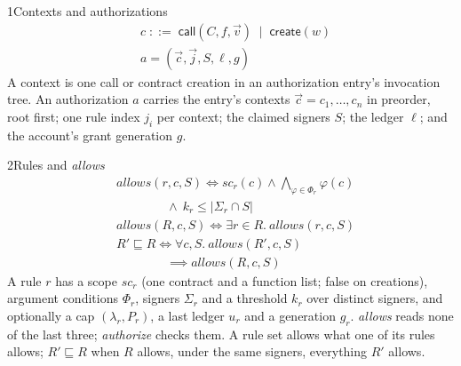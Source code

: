 \begin{perchdefinition}{1}{Contexts and authorizations}\label{def:contexts-and-authorizations}
\[\begin{aligned}&c \;::=\; \mathsf{call}(C, f, \vec v) \;\mid\; \mathsf{create}(w)\\
&a = (\vec c, \vec j, S, \ell, g)\end{aligned}\]
A context is one call or contract creation in an authorization entry's invocation tree. An authorization \(a\) carries the entry's contexts \(\vec c = c_1, \dots, c_n\) in preorder, root first; one rule index \(j_i\) per context; the claimed signers \(S\); the ledger \(\ell\); and the account's grant generation \(g\).
\end{perchdefinition}
\begin{perchdefinition}{2}{Rules and \emph{allows}}\label{def:rules-and-allows}
\[\begin{aligned}&\mathit{allows}(r, c, S) \iff \mathit{sc}_r(c) \land \bigwedge_{\varphi \in \Phi_r} \varphi(c)\\
&\qquad\qquad \land\ k_r \le |\Sigma_r \cap S|\\
&\mathit{allows}(R, c, S) \iff \exists r \in R.\ \mathit{allows}(r, c, S)\\
&R' \sqsubseteq R \iff \forall c, S.\ \mathit{allows}(R', c, S)\\
&\qquad\qquad \implies \mathit{allows}(R, c, S)\end{aligned}\]
A rule \(r\) has a scope \(\mathit{sc}_r\) (one contract and a function list; false on creations), argument conditions \(\Phi_r\), signers \(\Sigma_r\) and a threshold \(k_r\) over distinct signers, and optionally a cap \((\lambda_r, P_r)\), a last ledger \(u_r\) and a generation \(g_r\). \emph{allows} reads none of the last three; \emph{authorize} checks them. A rule set allows what one of its rules allows; \(R' \sqsubseteq R\) when \(R\) allows, under the same signers, everything \(R'\) allows.
\end{perchdefinition}
